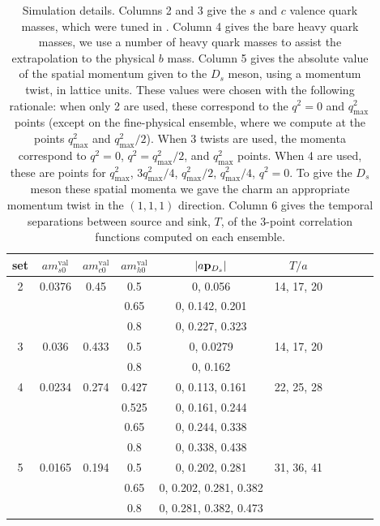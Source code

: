 \begin{table}[htb!]
  \begin{center}
    \begin{tabular}{c c c c c c c c c c}
      \hline
      set & $am_{s0}^{\text{val}}$ & $am_{c0}^{\text{val}}$ & $am^{\text{val}}_{h0}$ & $|a{\bf{p}}_{D_s}|$ & $T/a$ \\ [0.5ex]
      \hline
      2 & 0.0376 & 0.45
      & 0.5 & 0, 0.056 & 14, 17, 20 \\ [1ex]
      & & & 0.65 & 0, 0.142, 0.201 &  \\ [1ex]
      & & & 0.8 & 0, 0.227, 0.323 &  \\ [1ex]

      \hline
      3 & 0.036 & 0.433
      & 0.5 & 0, 0.0279 & 14, 17, 20 \\ [1ex]
      & & & 0.8 & 0, 0.162  & \\ [1ex]

      \hline
      4 & 0.0234 & 
      0.274 & 0.427 & 0, 0.113, 0.161 & 22, 25, 28 \\ [1ex]
      & & & 0.525 & 0, 0.161, 0.244 & \\ [1ex]
      & & & 0.65 & 0, 0.244, 0.338 & \\ [1ex]
      & & & 0.8 & 0, 0.338, 0.438 & \\ [1ex]

      \hline
      5 & 0.0165 
      & 0.194 & 0.5 & 0, 0.202, 0.281 & 31, 36, 41 \\ [1ex]
      & & & 0.65 & 0, 0.202, 0.281, 0.382 & \\ [1ex]
      & & & 0.8 & 0, 0.281, 0.382, 0.473 & \\ [1ex]
      \hline
    \end{tabular}
  \end{center}
  \caption{Simulation details. Columns 2 and 3 give the $s$ and $c$ valence quark masses, which were tuned in \cite{Chakraborty:2014aca}. Column 4 gives the bare heavy quark masses, we use a number of heavy quark masses to assist the extrapolation to the physical $b$ mass. Column 5 gives the absolute value of the spatial momentum given to the $D_s$ meson, using a momentum twist, in lattice units. These values were chosen with the following rationale: when only 2 are used, these correspond to the $q^2=0$ and $q^2_{\text{max}}\,$ points (except on the fine-physical ensemble, where we compute at the points $q^2_{\text{max}}$ and $q^2_{\text{max}}/2$). When 3 twists are used, the momenta correspond to $q^2=0$, $q^2=q^2_{\text{max}}/2$, and $q^2_{\text{max}}$ points. When 4 are used, these are points for $q^2_{\text{max}}$, $3q^2_{\text{max}}/4$, $q^2_{\text{max}}/2$, $q^2_{\text{max}}/4$, $q^2=0$. To give the $D_s$ meson these spatial momenta we gave the charm an appropriate momentum twist in the $(1,1,1)$ direction. Column 6 gives the temporal separations between source and sink, $T$, of the 3-point correlation functions computed on each ensemble.}
  \label{tab:simulation}
\end{table}

